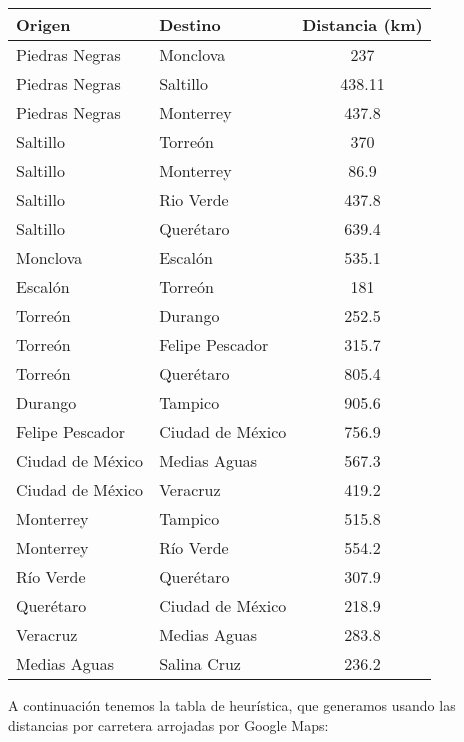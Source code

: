 \documentclass{article}
\begin{document}
\begin{enumerate}[\textbf{4.}]
\begin{itemize}[1.]
    \vspace{3mm}
    \begin{center}
      \begin{tabular}{l l c}
        \textbf{Origen} & \textbf{Destino} & \textbf{Distancia (km)} \\
        \hline 
        Piedras Negras & Monclova & 237 \\ %
        Piedras Negras & Saltillo & 438.11 \\
        Piedras Negras & Monterrey & 437.8 \\
        \hline
        Saltillo & Torreón & 370 \\
        Saltillo & Monterrey & 86.9 \\
        Saltillo & Rio Verde & 437.8 \\
        Saltillo & Querétaro & 639.4 \\
        \hline
        Monclova & Escalón & 535.1 \\
        \hline
        Escalón & Torreón & 181 \\
        \hline
        Torreón & Durango & 252.5 \\
        Torreón & Felipe Pescador & 315.7 \\
        Torreón & Querétaro & 805.4 \\
        \hline
        Durango & Tampico & 905.6 \\
        \hline
        Felipe Pescador & Ciudad de México & 756.9 \\
        \hline
        Ciudad de México & Medias Aguas & 567.3 \\ 
        Ciudad de México & Veracruz & 419.2 \\
        \hline
        Monterrey & Tampico & 515.8 \\
        Monterrey & Río Verde & 554.2 \\
        \hline
        Río Verde & Querétaro & 307.9 \\
        \hline
        Querétaro & Ciudad de México & 218.9 \\
        \hline
        Veracruz & Medias Aguas & 283.8 \\
        \hline
        Medias Aguas & Salina Cruz & 236.2 \\
      \end{tabular}
    \end{center}
  \end{itemize}

  \vspace{3mm}
  A continuación tenemos la tabla de heurística, que generamos usando las distancias 
  por carretera arrojadas por Google Maps:


\end{enumerate}
\end{document}
